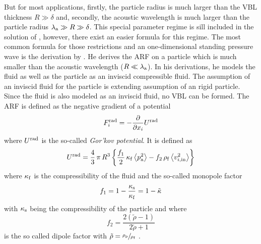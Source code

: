 But for most applications, firstly, the particle radius is much larger than the 
VBL thickness $R \gg \delta$ and, secondly, the acoustic wavelength is much 
larger than the particle radius $\lambda_{\mathrm{a}}\gg R \gg \delta$. This 
special parameter regime is sill included in the solution of 
, however, there exist an easier formula for this 
regime. The most common formula for those restrictions and an one-dimensional 
standing pressure wave is the derivation by . He derives the 
ARF on a particle which is much smaller than the acoustic wavelength 
($R\ll\lambda_{\mathrm{a}}$). In his derivations, he models the fluid as well as 
the particle as an inviscid compressible fluid. The assumption of an inviscid 
fluid for the particle is extending  assumption of an 
rigid particle. Since the fluid is also modeled as an inviscid fluid, no VBL 
can be formed. The ARF is defined as the negative gradient of a potential
\begin{equation}
  F^{\mathrm{rad}}_{i} = -\pdv{x_{i}}U^{\mathrm{rad}}
  \label{eq:TA-gorkov}
\end{equation}
where $U^{\mathrm{rad}}$ is the so-called \emph{Gor'kov potential}. It is defined 
as
\begin{equation}
  U^{\mathrm{rad}} = \frac{4}{3}\,\pi\,R^{3}\left\{ 
  \frac{f_{1}}{2}\,\kappa_{\mathrm{f}}\left\langle p^{2}_{\mathrm{a}} \right\rangle - 
f_{2}\,\rho_{\mathrm{f}}\left\langle v^{2}_{i,\mathrm{in}} \right\rangle \right\}
    \label{eq:TA-gorkov-potential}
\end{equation}
where $\kappa_{\mathrm{f}}$ is the compressibility of the fluid and the so-called 
monopole factor
\begin{equation}
  f_{1} = 1 - \frac{\kappa_{\mathrm{s}}}{\kappa_{\mathrm{f}}} = 1 - \tilde{\kappa}
  \label{eq:TA-fone}
\end{equation}
with $\kappa_{\mathrm{s}}$ being the compressibility of the particle and where
\begin{equation}
f_{2} = \frac{2(\tilde{\rho}-1)}{2\tilde{\rho}+1}
\label{eq:TA-ftwo}
\end{equation}
is the so called dipole factor with $\tilde{\rho} = \sfrac{\rho_{\mathrm{p}}}{\rho_{\mathrm{f}}}$ 
\cite{Gorkov1962,Bruus2012}.


